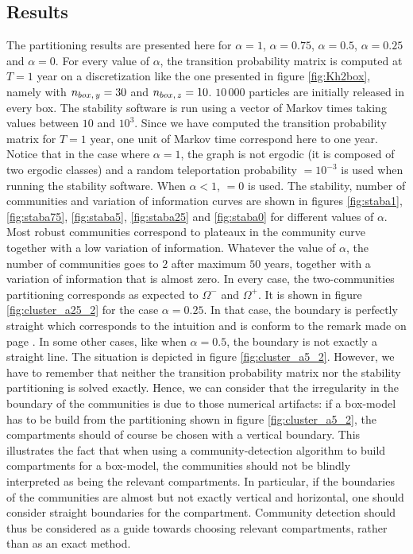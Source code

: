 \subsection{Results}
The partitioning results are presented here for $\alpha = 1$, $\alpha = 0.75$, $\alpha = 0.5$, $\alpha = 0.25$ and $\alpha = 0$. For every value of $\alpha$, the transition probability matrix is computed at $T = 1$ year on a discretization like the one presented in figure \ref{fig:Kh2box}, namely with $n_{box,\,y} = 30$ and $n_{box,\,z} = 10$. $10\,000$ particles are initially released in every box. The stability software is run using a vector of Markov times taking values between $10$ and $10^3$. Since we have computed the transition probability matrix for $T = 1$ year, one unit of Markov time correspond here to one year. Notice that in the case where $\alpha = 1$, the graph is not ergodic (it is composed of two ergodic classes) and a random teleportation probability  $= 10^{-3}$ is used when running the stability software. When $\alpha < 1$,  $=0$ is used.
The stability, number of communities and variation of information curves are shown in figures \ref{fig:staba1}, \ref{fig:staba75}, \ref{fig:staba5}, \ref{fig:staba25} and \ref{fig:staba0} for different values of $\alpha$. Most robust communities correspond to plateaux in the community curve together with a low variation of information. Whatever the value of $\alpha$, the number of communities goes to $2$ after maximum $50$ years, together with a variation of information that is almost zero. In every case, the two-communities partitioning corresponds as expected to $\Omega^-$ and $\Omega^+$. It is shown in figure \ref{fig:cluster_a25_2} for the case $\alpha = 0.25$. In that case, the boundary is perfectly straight which corresponds to the intuition and is conform to the remark made on page \pageref{remark:straightboundaries}. In some other cases, like when $\alpha = 0.5$, the boundary is not exactly a straight line. The situation is depicted in figure \ref{fig:cluster_a5_2}. However, we have to remember that neither the transition probability matrix nor the stability partitioning is solved exactly. Hence, we can consider that the irregularity in the boundary of the communities is due to those numerical artifacts: if a box-model has to be build from the partitioning shown in figure \ref{fig:cluster_a5_2}, the compartments should of course be chosen with a vertical boundary. This illustrates the fact that when using a community-detection algorithm to build compartments for a box-model, the communities should not be blindly interpreted as being the relevant compartments. In particular, if the boundaries of the communities are almost but not exactly vertical and horizontal, one should consider straight boundaries for the compartment. Community detection should thus be considered as a guide towards choosing relevant compartments, rather than as an exact method.

